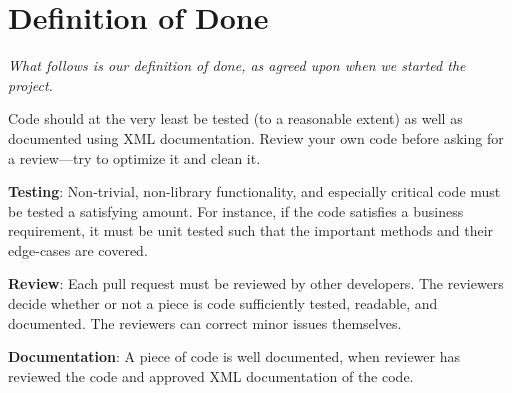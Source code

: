 \chapter{Definition of Done}\label{sec:definitionOfDone}
\textit{What follows is our definition of done, as agreed upon when we started the project.}

Code should at the very least be tested (to a reasonable extent) as well as documented using XML documentation. Review your own code before asking for a review---try to optimize it and clean it.

\textbf{Testing}: Non-trivial, non-library functionality, and especially critical code must be tested a satisfying amount. For instance, if the code satisfies a business requirement, it must be unit tested such that the important methods and their edge-cases are covered.  

\textbf{Review}: Each pull request must be reviewed by other developers. The reviewers decide whether or not a piece is code sufficiently tested, readable, and documented. The reviewers can correct minor issues themselves. 

\textbf{Documentation}: A piece of code is well documented, when reviewer has reviewed the code and approved XML documentation of the code.